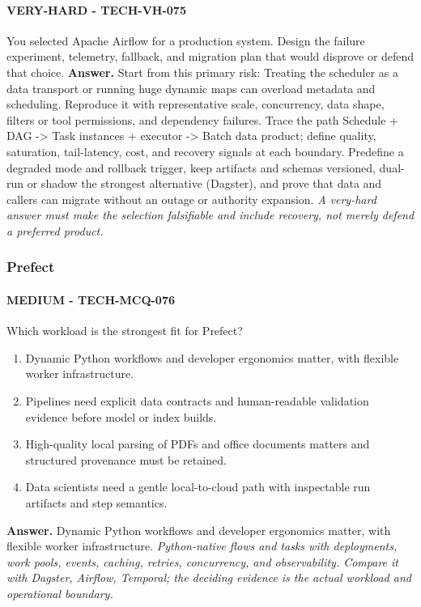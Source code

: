 \paragraph{VERY-HARD - TECH-VH-075} You selected Apache Airflow for a production system. Design the failure experiment, telemetry, fallback, and migration plan that would disprove or defend that choice.
\textbf{Answer.} Start from this primary risk: Treating the scheduler as a data transport or running huge dynamic maps can overload metadata and scheduling. Reproduce it with representative scale, concurrency, data shape, filters or tool permissions, and dependency failures. Trace the path Schedule + DAG -> Task instances + executor -> Batch data product; define quality, saturation, tail-latency, cost, and recovery signals at each boundary. Predefine a degraded mode and rollback trigger, keep artifacts and schemas versioned, dual-run or shadow the strongest alternative (Dagster), and prove that data and callers can migrate without an outage or authority expansion.
\textit{A very-hard answer must make the selection falsifiable and include recovery, not merely defend a preferred product.}
\subsubsection*{Prefect}
\paragraph{MEDIUM - TECH-MCQ-076} Which workload is the strongest fit for Prefect?
\begin{enumerate}[label=\Alph*.]
\item Dynamic Python workflows and developer ergonomics matter, with flexible worker infrastructure.
\item Pipelines need explicit data contracts and human-readable validation evidence before model or index builds.
\item High-quality local parsing of PDFs and office documents matters and structured provenance must be retained.
\item Data scientists need a gentle local-to-cloud path with inspectable run artifacts and step semantics.
\end{enumerate}
\textbf{Answer.} Dynamic Python workflows and developer ergonomics matter, with flexible worker infrastructure.
\textit{Python-native flows and tasks with deployments, work pools, events, caching, retries, concurrency, and observability. Compare it with Dagster, Airflow, Temporal; the deciding evidence is the actual workload and operational boundary.}

